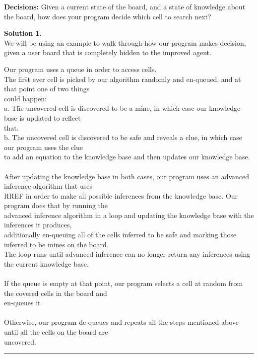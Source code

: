 \documentclass{article}
\theoremstyle{definition}
\def\fline{\rule{0.75\linewidth}{0.5pt}}
\newcommand{\finishline}{\vspace{-15pt}\begin{center}\fline\end{center}}
\newtheorem*{solution*}{Solution}
\newenvironment{solution}{\begin{solution*}}{{\finishline} \end{solution*}}
\begin{document}
\textbf{Decisions:}
	Given a current state of the board, and a state of knowledge about the board, how does your program decide which cell to search next? 
\begin{solution} \hfill \\
	We will be using an example to walk through how our program makes decision, given a user board that is completely hidden to the improved agent. 
	\begin{tabbing}
	Our program uses a queue in order to access cells. \\
	The fir\=st ever cell is picked by our algorithm randomly and en-queued, and at that point one of two things \\ could happen: \\
	
	\>a. T\=he uncovered cell is discovered to be a mine, in which case our knowledge base is updated to reflect\\ \>\>that. \\
	\>b. The uncovered cell is discovered to be safe and reveals a clue, in which case our program uses the clue\\ \>\>to add an equation to the knowledge base and then updates our knowledge base. \\\\
	
	After updating the knowledge base in both cases, our program uses an advanced inference algorithm that uses\\ RREF in order to make all possible inferences from the knowledge base. Our program does that by running the\\ advanced inference algorithm in a loop and updating the knowledge base with the inferences it produces, \\additionally en-queuing all of the cells inferred to be safe and marking those inferred to be mines on the board.\\ The loop runs until advanced inference can no longer return any inferences using the current knowledge base.\\\\
	
	If the queue is empty at that point, our program selects a cell at random from the covered cells in the board and\\ en-queues it\\\\
	
	Otherwise, our program de-queues and repeats all the steps mentioned above until all the cells on the board are\\ uncovered.
	\end{tabbing}
\end{solution}
\smallskip
\end{document}
